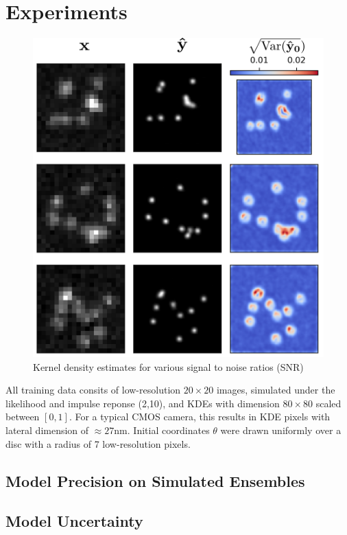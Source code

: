 \documentclass{article}
\begin{document}
\section{Experiments}

\begin{figure}
\centering
\includegraphics[scale=0.8]{Samples.png}
\caption{Kernel density estimates for various signal to noise ratios (SNR)}
\end{figure}

All training data consits of low-resolution $20\times 20$ images, simulated under the likelihood and impulse reponse (2,10), and KDEs with dimension $80\times 80$ scaled between $[0,1]$. For a typical CMOS camera, this results in KDE pixels with lateral dimension of $\approx 27\mathrm{nm}$. Initial coordinates $\theta$ were drawn uniformly over a disc with a radius of 7 low-resolution pixels.

\subsection{Model Precision on Simulated Ensembles}

\subsection{Model Uncertainty}
\end{document}
